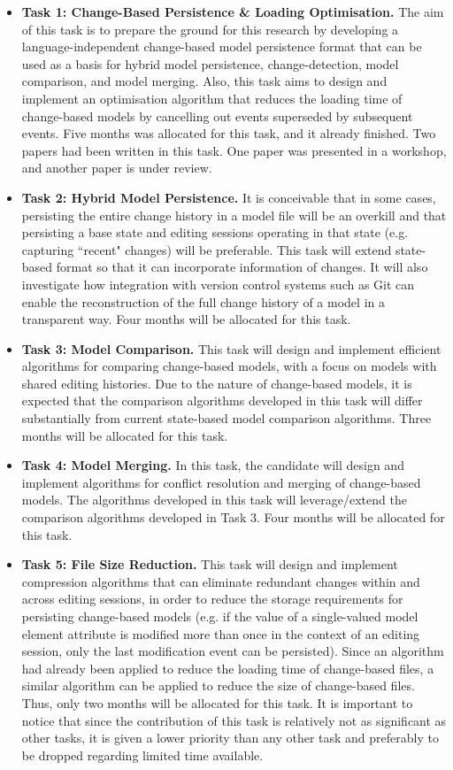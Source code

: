 \documentclass[12pt, a4paper]{report} \usepackage[titletoc]{appendix}
\begin{document}
\begin{itemize}
    \item \textbf{Task 1: Change-Based Persistence \& Loading Optimisation.}  The aim of this task is to prepare the ground for this research by developing a language-independent change-based model persistence format that can be used as a basis for hybrid model persistence, change-detection, model comparison, and model merging. Also, this task aims to design and implement an optimisation algorithm that reduces the loading time of change-based models by cancelling out events superseded by subsequent events. Five months was allocated for this task, and it already finished. Two papers had been written in this task. One paper was presented in a workshop, and another paper is under review.
    \item \textbf{Task 2: Hybrid Model Persistence.} It is conceivable that in some cases, persisting the entire change history in a model file will be an overkill and that persisting a base state and editing sessions operating in that state (e.g. capturing ``recent" changes) will be preferable. This task will extend state-based format so that it can incorporate information of changes. It will also investigate how integration with version control systems such as Git can enable the reconstruction of the full change history of a model in a transparent way. Four months will be allocated for this task. 
    \item \textbf{Task 3: Model Comparison.} This task will design and implement efficient algorithms for comparing change-based models, with a focus on models with shared editing histories. Due to the nature of change-based models, it is expected that the comparison algorithms developed in this task will differ substantially from current state-based model comparison algorithms. Three months will be allocated for this task. 
    \item \textbf{Task 4: Model Merging.} In this task, the candidate will design and implement algorithms for conflict resolution and merging of change-based models. The algorithms developed in this task will leverage/extend the comparison algorithms developed in Task 3. Four months will be allocated for this task. 
    \item \textbf{Task 5: File Size Reduction.} This task will design and implement compression algorithms that can eliminate redundant changes within and across editing sessions, in order to reduce the storage requirements for persisting change-based models (e.g. if the value of a single-valued model element attribute is modified more than once in the context of an editing session, only the last modification event can be persisted). Since an algorithm had already been applied to reduce the loading time of change-based files, a similar algorithm can be applied to reduce the size of change-based files. Thus, only two months will be allocated for this task. It is important to notice that since the contribution of this task is relatively not as significant as other tasks, it is given a lower priority than any other task and preferably to be dropped regarding limited time available.

\end{itemize}
\end{document}
